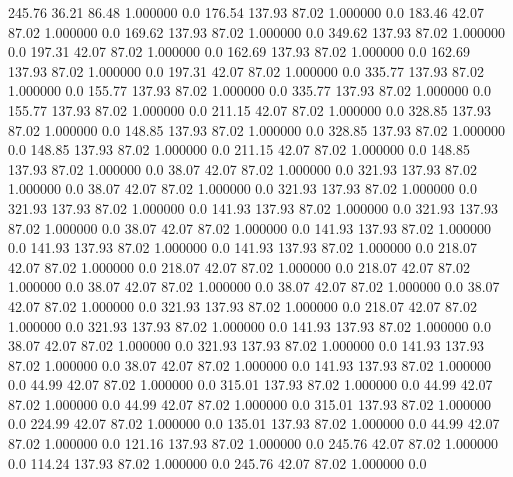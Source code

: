   245.76   36.21   86.48    1.000000    0.0
  176.54  137.93   87.02    1.000000    0.0
  183.46   42.07   87.02    1.000000    0.0
  169.62  137.93   87.02    1.000000    0.0
  349.62  137.93   87.02    1.000000    0.0
  197.31   42.07   87.02    1.000000    0.0
  162.69  137.93   87.02    1.000000    0.0
  162.69  137.93   87.02    1.000000    0.0
  197.31   42.07   87.02    1.000000    0.0
  335.77  137.93   87.02    1.000000    0.0
  155.77  137.93   87.02    1.000000    0.0
  335.77  137.93   87.02    1.000000    0.0
  155.77  137.93   87.02    1.000000    0.0
  211.15   42.07   87.02    1.000000    0.0
  328.85  137.93   87.02    1.000000    0.0
  148.85  137.93   87.02    1.000000    0.0
  328.85  137.93   87.02    1.000000    0.0
  148.85  137.93   87.02    1.000000    0.0
  211.15   42.07   87.02    1.000000    0.0
  148.85  137.93   87.02    1.000000    0.0
   38.07   42.07   87.02    1.000000    0.0
  321.93  137.93   87.02    1.000000    0.0
   38.07   42.07   87.02    1.000000    0.0
  321.93  137.93   87.02    1.000000    0.0
  321.93  137.93   87.02    1.000000    0.0
  141.93  137.93   87.02    1.000000    0.0
  321.93  137.93   87.02    1.000000    0.0
   38.07   42.07   87.02    1.000000    0.0
  141.93  137.93   87.02    1.000000    0.0
  141.93  137.93   87.02    1.000000    0.0
  141.93  137.93   87.02    1.000000    0.0
  218.07   42.07   87.02    1.000000    0.0
  218.07   42.07   87.02    1.000000    0.0
  218.07   42.07   87.02    1.000000    0.0
   38.07   42.07   87.02    1.000000    0.0
   38.07   42.07   87.02    1.000000    0.0
   38.07   42.07   87.02    1.000000    0.0
  321.93  137.93   87.02    1.000000    0.0
  218.07   42.07   87.02    1.000000    0.0
  321.93  137.93   87.02    1.000000    0.0
  141.93  137.93   87.02    1.000000    0.0
   38.07   42.07   87.02    1.000000    0.0
  321.93  137.93   87.02    1.000000    0.0
  141.93  137.93   87.02    1.000000    0.0
   38.07   42.07   87.02    1.000000    0.0
  141.93  137.93   87.02    1.000000    0.0
   44.99   42.07   87.02    1.000000    0.0
  315.01  137.93   87.02    1.000000    0.0
   44.99   42.07   87.02    1.000000    0.0
   44.99   42.07   87.02    1.000000    0.0
  315.01  137.93   87.02    1.000000    0.0
  224.99   42.07   87.02    1.000000    0.0
  135.01  137.93   87.02    1.000000    0.0
   44.99   42.07   87.02    1.000000    0.0
  121.16  137.93   87.02    1.000000    0.0
  245.76   42.07   87.02    1.000000    0.0
  114.24  137.93   87.02    1.000000    0.0
  245.76   42.07   87.02    1.000000    0.0
